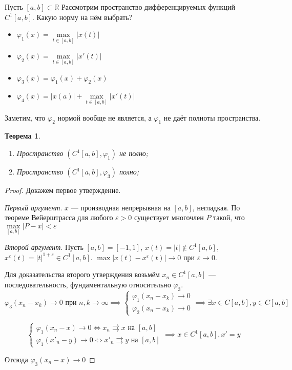 \documentclass[11pt,openany,a4paper]{scrartcl}
\theoremstyle{plain}
\newtheorem{theorem}{Теорема}[section]
\theoremstyle{definition}
\newcommand\mb{\mathbb}
\newcommand\real{\mb R}
\newcommand{\uto}{\rightrightarrows}
\begin{document}
Пусть $[a, b] \subset \real$ Рассмотрим пространство дифференцируемых функций $C^1[a, b]$. 
Какую норму на нём выбрать?
\begin{itemize}
	\item $\varphi_1(x) = \max\limits_{t \in [a, b]} |x(t)|$
	\item $\varphi_2(x) = \max\limits_{t \in [a, b]} |x'(t)|$
	\item $\varphi_3(x) = \varphi_1(x) + \varphi_2(x)$
	\item $\varphi_4(x) = |x(a)| + \max\limits_{t \in [a, b]} |x'(t)|$
\end{itemize}

Заметим, что $\varphi_2$ нормой вообще не является, а $\varphi_1$ не даёт полноты 
пространства.

\begin{theorem}
	\begin{enumerate}
		\item Пространство $(C^1 [a, b], \varphi_1)$ не полно;
		\item Пространство $(C^1 [a, b], \varphi_3)$ полно;
	\end{enumerate}
\end{theorem}

\begin{proof}
	Докажем первое утверждение.
	
	\emph{Первый аргумент}. $x$ — производная непрерывная на $[a, b]$, негладкая.
		По теореме Вейерштрасса для любого $\varepsilon > 0$ существует многочлен
		$P$ такой, что $\max\limits_{[a, b]} |P - x| < \varepsilon$
	
	\emph{Второй аргумент}. Пусть $[a, b] = [-1, 1]$, $x(t) = |t| \notin C^1[a, b]$,
	$x^\varepsilon(t) = |t|^{1 + \varepsilon} \in C^1[a, b]$. $\max |x(t) - x^\varepsilon(t)| \to 0$ при $\varepsilon \to 0$.
	
	Для доказательства второго утверждения возьмём $x_n \in C^1[a, b]$ — 
	последовательность, фундаментальную относительно $\varphi_3$.
	$$
	\varphi_3(x_n -x_k) \to 0\text{ при } n, k \to \infty \implies
	\begin{cases}
		\varphi_1(x_n - x_k) \to 0\\
		\varphi_2(x_n - x_k) \to 0
	\end{cases}
	\implies \exists x \in C[a, b], y \in C[a, b]
	$$
	
	$$
	\begin{cases}
		\varphi_1(x_n - x) \to 0 \iff x_n \uto x \text{ на } [a, b]\\
		\varphi_1(x'_n - y) \to 0 \iff x'_n \uto y \text{ на } [a, b]
	\end{cases}
	\implies x \in C^1[a, b], x' = y
	$$
	
	Отсюда $\varphi_3(x_n - x) \to 0$
\end{proof}
\end{document}

